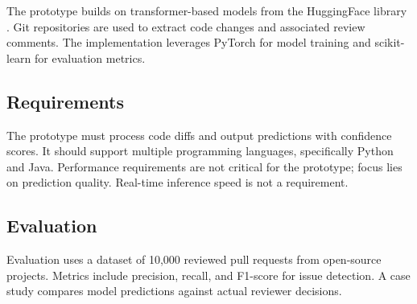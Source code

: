 \documentclass[usebib,embedsources]{compactarticle}
\begin{document}
The prototype builds on transformer-based models from the HuggingFace library \cite{Author24Generic}.
Git repositories are used to extract code changes and associated review comments.
The implementation leverages PyTorch for model training and scikit-learn for evaluation metrics.

\subsection{Requirements}

The prototype must process code diffs and output predictions with confidence scores.
It should support multiple programming languages, specifically Python and Java.
Performance requirements are not critical for the prototype; focus lies on prediction quality.
Real-time inference speed is not a requirement.

\subsection{Evaluation}

Evaluation uses a dataset of 10,000 reviewed pull requests from open-source projects.
Metrics include precision, recall, and F1-score for issue detection.
A case study compares model predictions against actual reviewer decisions.
\end{document}

